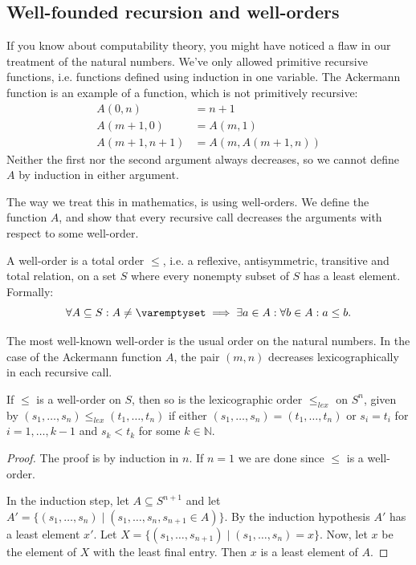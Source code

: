 \documentclass[a4paper, 12pt]{article}
\newcommand{\N}{\mathbb{N}}
\theoremstyle{changedot}
\theoremstyle{changedotbreak}
\theoremstyle{nonumberplain}
\newtheorem{proof}{Proof}
\begin{document}
\subsection{Well-founded recursion and well-orders}
If you know about computability theory, you might have noticed a flaw in our treatment of the natural numbers. We've only allowed primitive recursive functions, i.e. functions defined using induction in one variable. The Ackermann function is an example of a function, which is not primitively recursive:
\begin{align*}
  A(0, n) &= n + 1 \\
  A(m + 1, 0) &= A(m, 1) \\
  A(m + 1, n + 1) &= A(m, A(m + 1, n))
\end{align*}
Neither the first nor the second argument always decreases, so we cannot define $A$ by induction in either argument.

The way we treat this in mathematics, is using well-orders. We define the function $A$, and show that every recursive call decreases the arguments with respect to some well-order.

\begin{definition}
  A well-order is a total order $\leq$, i.e. a reflexive, antisymmetric, transitive and total relation, on a set $S$ where every nonempty subset of $S$ has a least element. Formally:
  \[\forall A \subseteq S : A \neq \varemptyset \implies \exists a \in A: \forall b \in A: a \leq b.\]
\end{definition}

The most well-known well-order is the usual order on the natural numbers. In the case of the Ackermann function $A$, the pair $(m, n)$ decreases lexicographically in each recursive call.

\begin{proposition}
  If $\leq$ is a well-order on $S$, then so is the lexicographic order $\leq_{lex}$ on $S^{n}$, given by $(s_{1}, \dots, s_{n}) \leq_{lex} (t_{1}, \dots, t_{n})$ if either $(s_{1}, \dots, s_{n}) = (t_{1}, \dots, t_{n})$ or $s_{i} = t_{i}$ for $i=1, \dots, k-1$ and $s_{k} < t_{k}$ for some $k \in \N$.
\end{proposition}
\begin{proof}
  The proof is by induction in $n$. If $n = 1$ we are done since $\leq$ is a well-order.

  In the induction step, let $A \subseteq S^{n+1}$ and let $A' = \{(s_{1}, \dots, s_{n}) \mid (s_{1}, \dots, s_{n}, s_{n+1} \in A)\}$. By the induction hypothesis $A'$ has a least element $x'$. Let $X = \{(s_{1}, \dots, s_{n+1}) \mid (s_{1}, \dots, s_{n}) = x\}$. Now, let $x$ be the element of $X$ with the least final entry. Then $x$ is a least element of $A$.
\end{proof}
\end{document}
